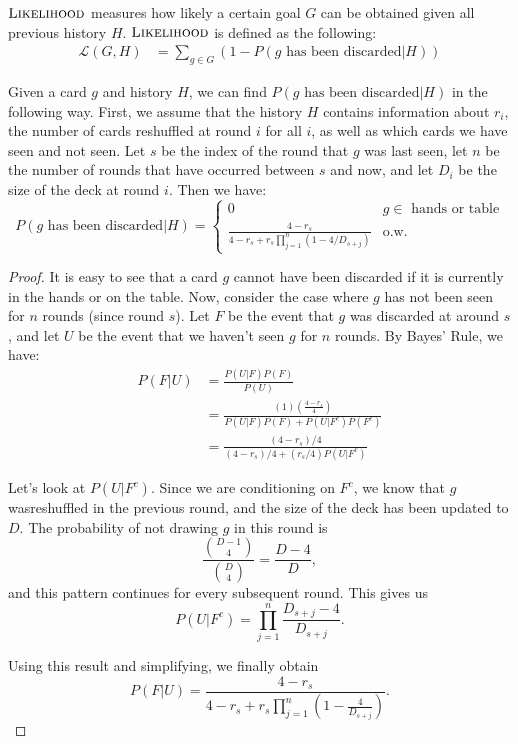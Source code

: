 \documentclass[11pt]{article}
\newcommand{\lkhd}{\textsc{Likelihood}}
\begin{document}
$\lkhd$ measures how likely a certain goal $G$ can be obtained given all previous history $H$. $\lkhd$ is defined as the following:
\begin{align}
  \mathcal{L}(G,H) &= \sum_{g \in G} (1 - P(g \text{ has been discarded}|H))
\end{align}

Given a card $g$ and history $H$, we can find $P(g \text{ has been discarded}|H)$ in the following way. First, we assume that the history $H$ contains information about $r_i$, the number of cards reshuffled at round $i$ for all $i$, as well as which cards we have seen and not seen. Let $s$ be the index of the round that $g$ was last seen, let $n$ be the number of rounds that have occurred between $s$ and now, and let $D_i$ be the size of the deck at round $i$. Then we have:
\begin{equation}
P(g \text{ has been discarded}|H) = \begin{cases}
  0 & g \in \text{ hands or table} \\
  \frac{4-r_s}{4-r_s+r_s\prod_{j=1}^n(1-4/{D_{s+j}})} & \text{o.w.}
\end{cases}
\label{eq:p-discarded} \end{equation}

\begin{proof}
  It is easy to see that a card $g$ cannot have been discarded if it is currently in the hands or on the table. Now, consider the case where $g$ has not been seen for $n$ rounds (since round $s$). Let $F$ be the event that $g$ was discarded at around $s$, and let $U$ be the event that we haven't seen $g$ for $n$ rounds. By Bayes' Rule, we have:
\begin{align}
  P(F|U) &= \frac{P(U|F)P(F)}{P(U)} \\
  &= \frac{(1)\left(\frac{4-r_s}{4}\right)}{P(U|F)P(F) + P(U|F^c)P(F^c)} \\
  &= \frac{(4-r_s)/4}{(4-r_s)/4 + (r_s/4)P(U|F^c)}
\end{align}

Let's look at $P(U|F^c)$. Since we are conditioning on $F^c$, we know that $g$ wasreshuffled in the previous round, and the size of the deck has been updated to $D$. The probability of not drawing $g$ in this round is
\begin{equation}
  \frac{{D-1 \choose 4}}{{D \choose 4}} = \frac{D-4}{D},
\end{equation} and this pattern continues for every subsequent round. This gives us
\begin{equation}
  P(U|F^c) = \prod_{j=1}^n \frac{D_{s+j} - 4}{D_{s+j}}.
\end{equation}

Using this result and simplifying, we finally obtain
\begin{equation}
  P(F|U) = \frac{4-r_s}{4-r_s+r_s\prod_{j=1}^n(1-\frac{4}{{D_{s+j}}})}.
\end{equation}
\end{proof}
\end{document}
